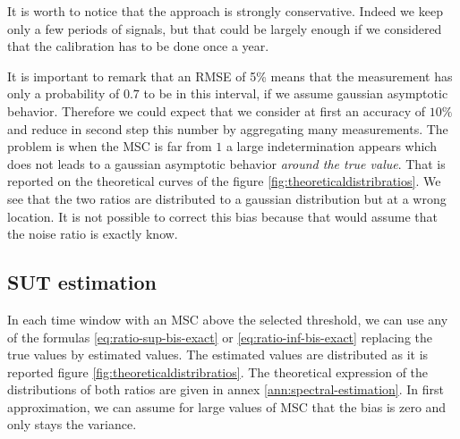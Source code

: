 It is worth to notice that the approach is strongly conservative. Indeed we keep only a few periods of signals, but that could be largely enough if we considered that the calibration has to be done once a year.





  \newpage
 It is important to remark that an RMSE of 5\% means that the measurement has only a probability of $0.7$ to be in this interval, if we assume gaussian asymptotic behavior. Therefore we could expect that we consider at first an accuracy of $10\%$ and reduce in second step this number by aggregating many measurements. The problem is when the MSC is far from $1$ a large indetermination appears which does not leads to a gaussian asymptotic behavior \emph{around the true value}. That is reported on the theoretical curves of the figure \ref{fig:theoreticaldistribratios}. We see that the two ratios are distributed to a gaussian distribution but at a wrong location. It is not possible to correct this bias because that would assume that  the noise ratio is exactly know.




\subsection{SUT estimation}
In each time window with an MSC above the selected threshold, we can use any of the formulas \eqref{eq:ratio-sup-bis-exact} or  \eqref{eq:ratio-inf-bis-exact} replacing the true values by estimated values. The estimated values are distributed as it is reported figure \ref{fig:theoreticaldistribratios}.  The theoretical expression of the distributions of both ratios are given in annex \ref{ann:spectral-estimation}. In first approximation, we can assume for large values of MSC that the bias is zero and only stays the variance.

